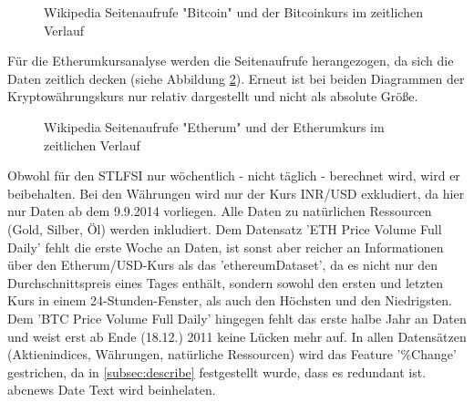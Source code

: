 \begin{figure}[H]
\centering
{}
\caption{Wikipedia Seitenaufrufe "Bitcoin" und der Bitcoinkurs im zeitlichen Verlauf}
\label{fig:WikiBTC}
\end{figure}
Für die Etherumkursanalyse werden die Seitenaufrufe herangezogen, da sich die Daten zeitlich decken (siehe Abbildung \ref{fig:WikiETH}). Erneut ist bei beiden Diagrammen der Kryptowährungskurs nur relativ dargestellt und nicht als absolute Größe.
\begin{figure}[H]
\centering
{}
\caption{Wikipedia Seitenaufrufe "Etherum" und der Etherumkurs im zeitlichen Verlauf}
\label{fig:WikiETH}
\end{figure}
Obwohl für den STLFSI nur wöchentlich - nicht täglich - berechnet wird, wird er beibehalten. Bei den Währungen wird nur der Kurs INR/USD exkludiert, da hier nur Daten ab dem 9.9.2014 vorliegen. Alle Daten zu natürlichen Ressourcen (Gold, Silber, Öl) werden inkludiert.
Dem Datensatz 'ETH \textunderscore Price \textunderscore Volume \textunderscore Full \textunderscore Daily' fehlt die erste Woche an Daten, ist sonst aber reicher an Informationen über den Etherum/USD-Kurs als das 'ethereumDataset', da es nicht nur den Durchschnittspreis eines Tages enthält, sondern sowohl den ersten und letzten Kurs in einem 24-Stunden-Fenster, als auch den Höchsten und den Niedrigsten. Dem 'BTC \textunderscore Price \textunderscore Volume \textunderscore Full \textunderscore Daily' hingegen fehlt das erste halbe Jahr an Daten und weist erst ab Ende (18.12.) 2011 keine Lücken mehr auf. In allen Datensätzen (Aktienindices, Währungen, natürliche Ressourcen) wird das Feature '\%Change' gestrichen, da in \ref{subsec:describe} festgestellt wurde, dass es redundant ist.
abcnews \textunderscore Date \textunderscore Text wird beinhelaten.

